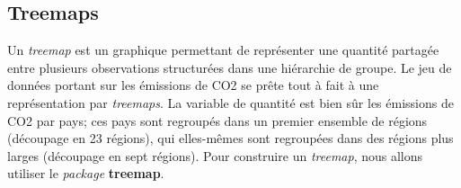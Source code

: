 \documentclass[
  11pt,
  french,
]{book}
\begin{document}
\hypertarget{sect0334}{%
\subsection{Treemaps}\label{sect0334}}

Un \emph{treemap} est un graphique permettant de représenter une quantité partagée entre plusieurs observations structurées dans une hiérarchie de groupe. Le jeu de données portant sur les émissions de CO2 se prête tout à fait à une représentation par \emph{treemaps}. La variable de quantité est bien sûr les émissions de CO2 par pays; ces pays sont regroupés dans un premier ensemble de régions (découpage en 23 régions), qui elles-mêmes sont regroupées dans des régions plus larges (découpage en sept régions). Pour construire un \emph{treemap}, nous allons utiliser le \emph{package} \textbf{treemap}.
\end{document}
